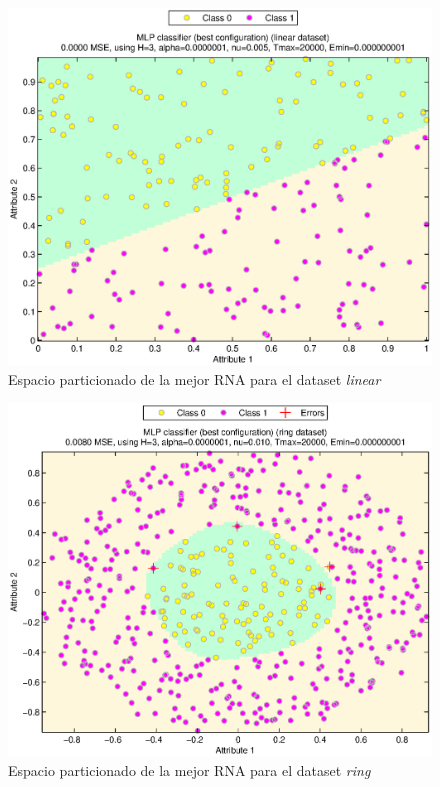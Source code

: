 \documentclass[journal]{IEEEtran}
\begin{document}
\begin{figure}[tb]
	\centering
	\includegraphics[width=\columnwidth]{imagenes/linear}
	\caption{Espacio particionado de la mejor RNA para el dataset \emph{linear}}
	\label{fig:espacio-particionado-linear}
\end{figure}

\begin{figure}[tb]
	\centering
	\includegraphics[width=\columnwidth]{imagenes/ring}
	\caption{Espacio particionado de la mejor RNA para el dataset \emph{ring}}
	\label{fig:espacio-particionado-ring}
\end{figure}
\end{document}
